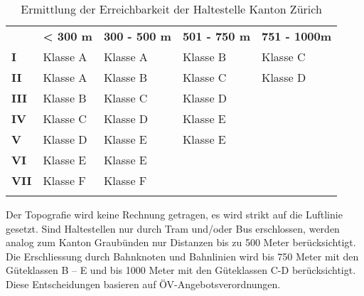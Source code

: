 \begin{longtable}[c]{l p{3.3cm} p{3.3cm} p{3.3cm} p{3.3cm}}
        \midrule
        \textbf{}
                                & \textbf{< 300 m}
                                & \textbf{300 - 500 m}
                                & \textbf{501 - 750 m}
                                & \textbf{751 - 1000m}\\
        \textbf{I}
                                & Klasse A
                                & Klasse A
                                & Klasse B
                                & Klasse C\\
        \textbf{II}
                                & Klasse A
                                & Klasse B
                                & Klasse C
                                & Klasse D\\
        \textbf{III}
                                & Klasse B
                                & Klasse C
                                & Klasse D
                                &\\
        \textbf{IV}
                                & Klasse C
                                & Klasse D
                                & \cellcolor{red!25}Klasse E
                                &\\
        \textbf{V}
                                & Klasse D
                                & \cellcolor{red!25}Klasse E
                                & \cellcolor{red!25}Klasse E
                                &\\
        \cellcolor{red!25}\textbf{VI}
                                & \cellcolor{red!25}Klasse E
                                & \cellcolor{red!25}Klasse E
                                &
                                &\\
        \cellcolor{red!25}\textbf{VII}
                                & \cellcolor{red!25}Klasse F
                                & \cellcolor{red!25}Klasse F
                                &
                                &\\                                
        \bottomrule
    \caption{Ermittlung der Erreichbarkeit der Haltestelle Kanton Zürich}
    \label{table:Ermittlung Erreichbarkeit der Haltestelle Kanton Zürich}
\end{longtable}

Der Topografie wird keine Rechnung getragen, es wird strikt auf die Luftlinie gesetzt.
Sind Haltestellen nur durch Tram und/oder Bus erschlossen, werden analog zum Kanton Graubünden nur Distanzen bis zu 500 Meter berücksichtigt.
Die Erschliessung durch Bahnknoten und Bahnlinien wird bis 750 Meter mit den Güteklassen B – E und bis 1000 Meter mit den Güteklassen C-D berücksichtigt.
Diese Entscheidungen basieren auf ÖV-Angebotsverordnungen.

